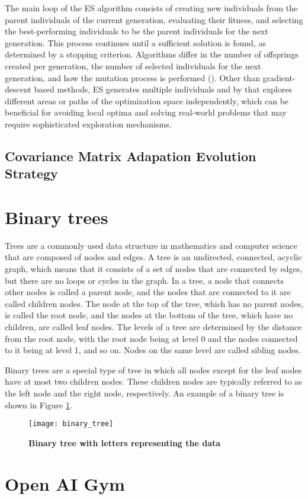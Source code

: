 The main loop of the ES algorithm consists of creating new individuals from the parent individuals of the current generation, evaluating their fitness, and selecting the best-performing individuals to be the parent individuals for the next generation. This process continues until a sufficient solution is found, as determined by a stopping criterion. Algorithms differ in the number of offsprings created per generation, the number of selected individuals for the next generation, and how the mutation process is performed (\cite{salimans_evolution_2017}). Other than gradient-descent based methods, ES generates multiple individuals and by that explores different areas or paths of the optimization space independently, which can be beneficial for avoiding local optima and solving real-world problems that may require sophisticated exploration mechanisms.


\subsection{Covariance Matrix Adapation Evolution Strategy}

\section{Binary trees}

Trees are a commonly used data structure in mathematics and computer science that are composed of nodes and edges. A tree is an undirected, connected, acyclic graph, which means that it consists of a set of nodes that are connected by edges, but there are no loops or cycles in the graph. In a tree, a node that connects other nodes is called a parent node, and the nodes that are connected to it are called children nodes. The node at the top of the tree, which has no parent nodes, is called the root node, and the nodes at the bottom of the tree, which have no children, are called leaf nodes. The levels of a tree are determined by the distance from the root node, with the root node being at level 0 and the nodes connected to it being at level 1, and so on. Nodes on the same level are called sibling nodes.

Binary trees are a special type of tree in which all nodes except for the leaf nodes have at most two children nodes. These children nodes are typically referred to as the left node and the right node, respectively. An example of a binary tree is shown in Figure \ref{fig:binary_tree}.

\begin{figure}[!ht]
\centering
\texttt{[image: binary\_tree]}
\caption[Binary tree with letters representing the data]{
  \textbf{Binary tree with letters representing the data}
  }
\label{fig:binary_tree}
\end{figure}

\section{Open AI Gym}





